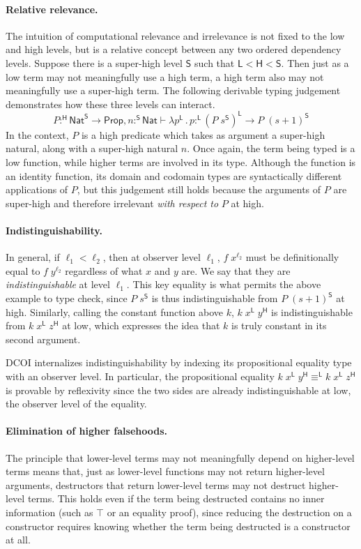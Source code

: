 \documentclass{article}
\newcommand{\kw}[1]{\mathsf{#1}}
\newcommand{\HH}{\mathsf{H}}
\newcommand{\LL}{\mathsf{L}}
\renewcommand{\SS}{\mathsf{S}}
\begin{document}
\paragraph{Relative relevance.}
The intuition of computational relevance and irrelevance
is not fixed to the low and high levels,
but is a relative concept between any two ordered dependency levels.
Suppose there is a super-high level $\SS$ such that $\LL < \HH < \SS$.
Then just as a low term may not meaningfully use a high term,
a high term also may not meaningfully use a super-high term.
The following derivable typing judgement demonstrates
how these three levels can interact.
$$P :^\HH \kw{Nat}^\SS \to \kw{Prop}, n :^\SS \kw{Nat} \vdash \lambda p^\LL \mathpunct{.} p :^\LL
  (P \; s^\SS)^\LL \to P \; (s + 1)^\SS$$
In the context, $P$ is a high predicate which takes as argument a super-high natural,
along with a super-high natural $n$.
Once again, the term being typed is a low function,
while higher terms are involved in its type.
Although the function is an identity function,
its domain and codomain types are syntactically different applications of $P$,
but this judgement still holds because the arguments of $P$ are super-high
and therefore irrelevant \emph{with respect to} $P$ at high.

\paragraph{Indistinguishability.}
In general, if $\ell_1 < \ell_2$, then at observer level $\ell_1$,
$f \; x^{\ell_2}$ must be definitionally equal to $f \; y^{\ell_2}$
regardless of what $x$ and $y$ are.
We say that they are \emph{indistinguishable} at level $\ell_1$.
This key equality is what permits the above example to type check,
since $P \; s^\SS$ is thus indistinguishable from $P \; (s + 1)^\SS$ at high.
Similarly, calling the constant function above $k$,
$k \; x^\LL \; y^\HH$ is indistinguishable from $k \; x^\LL \; z^\HH$ at low,
which expresses the idea that $k$ is truly constant in its second argument.

DCOI internalizes indistinguishability by indexing
its propositional equality type with an observer level.
In particular, the propositional equality
$k \; x^\LL \; y^\HH \equiv^\LL k \; x^\LL \; z^\HH$
is provable by reflexivity since the two sides are already indistinguishable
at low, the observer level of the equality.

\paragraph{Elimination of higher falsehoods.}
The principle that lower-level terms may not meaningfully depend
on higher-level terms means that,
just as lower-level functions may not return higher-level arguments,
destructors that return lower-level terms may not destruct higher-level terms.
This holds even if the term being destructed contains no inner information
(such as $\top$ or an equality proof),
since reducing the destruction on a constructor requires knowing
whether the term being destructed is a constructor at all.
\end{document}
